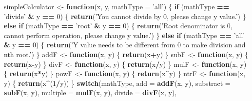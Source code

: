 \documentclass[]{book}
\newenvironment{Shaded}{\begin{snugshade}}{\end{snugshade}}
\newcommand{\KeywordTok}[1]{\textcolor[rgb]{0.13,0.29,0.53}{\textbf{#1}}}
\newcommand{\DataTypeTok}[1]{\textcolor[rgb]{0.13,0.29,0.53}{#1}}
\newcommand{\DecValTok}[1]{\textcolor[rgb]{0.00,0.00,0.81}{#1}}
\newcommand{\StringTok}[1]{\textcolor[rgb]{0.31,0.60,0.02}{#1}}
\newcommand{\ControlFlowTok}[1]{\textcolor[rgb]{0.13,0.29,0.53}{\textbf{#1}}}
\newcommand{\OperatorTok}[1]{\textcolor[rgb]{0.81,0.36,0.00}{\textbf{#1}}}
\newcommand{\NormalTok}[1]{#1}
\theoremstyle{definition}
\theoremstyle{definition}
\theoremstyle{definition}
\theoremstyle{remark}
\begin{document}
\begin{Shaded}
\begin{Highlighting}[]
\NormalTok{simpleCalculator <-}\StringTok{ }\ControlFlowTok{function}\NormalTok{(x, y, }\DataTypeTok{mathType =} \StringTok{'all'}\NormalTok{) \{}
  \ControlFlowTok{if}\NormalTok{ (mathType }\OperatorTok{==}\StringTok{ 'divide'} \OperatorTok{&}\StringTok{ }\NormalTok{y }\OperatorTok{==}\StringTok{ }\DecValTok{0}\NormalTok{) \{}
    \KeywordTok{return}\NormalTok{(}\StringTok{'You cannot divide by 0, please change y value.'}\NormalTok{)}
\NormalTok{  \} }\ControlFlowTok{else} \ControlFlowTok{if}\NormalTok{ (mathType }\OperatorTok{==}\StringTok{ 'root'} \OperatorTok{&}\StringTok{ }\NormalTok{y }\OperatorTok{==}\StringTok{ }\DecValTok{0}\NormalTok{) \{}
    \KeywordTok{return}\NormalTok{(}\StringTok{'Root denominator is 0, cannot perform operation, please change y value.'}\NormalTok{)}
\NormalTok{  \} }\ControlFlowTok{else} \ControlFlowTok{if}\NormalTok{ (mathType }\OperatorTok{==}\StringTok{ 'all'} \OperatorTok{&}\StringTok{ }\NormalTok{y }\OperatorTok{==}\StringTok{ }\DecValTok{0}\NormalTok{) \{}
    \KeywordTok{return}\NormalTok{(}\StringTok{'Y value needs to be different from 0 to make division and nth root.'}\NormalTok{)}
\NormalTok{  \}}
\NormalTok{  addF <-}\StringTok{ }\ControlFlowTok{function}\NormalTok{(x, y) \{}
  \KeywordTok{return}\NormalTok{(x}\OperatorTok{+}\NormalTok{y)}
\NormalTok{  \}}
\NormalTok{  subF <-}\StringTok{ }\ControlFlowTok{function}\NormalTok{(x, y) \{}
  \KeywordTok{return}\NormalTok{(x}\OperatorTok{-}\NormalTok{y)}
\NormalTok{  \}}
\NormalTok{  divF <-}\StringTok{ }\ControlFlowTok{function}\NormalTok{(x, y) \{}
  \KeywordTok{return}\NormalTok{(x}\OperatorTok{/}\NormalTok{y)}
\NormalTok{  \}}
\NormalTok{  mulF <-}\StringTok{ }\ControlFlowTok{function}\NormalTok{(x, y) \{}
  \KeywordTok{return}\NormalTok{(x}\OperatorTok{*}\NormalTok{y)}
\NormalTok{  \}}
\NormalTok{  powF <-}\StringTok{ }\ControlFlowTok{function}\NormalTok{(x, y) \{}
  \KeywordTok{return}\NormalTok{(x}\OperatorTok{^}\NormalTok{y)}
\NormalTok{  \}}
\NormalTok{  ntrF <-}\StringTok{ }\ControlFlowTok{function}\NormalTok{(x, y) \{}
  \KeywordTok{return}\NormalTok{(x}\OperatorTok{^}\NormalTok{(}\DecValTok{1}\OperatorTok{/}\NormalTok{y))}
\NormalTok{  \}}
  \ControlFlowTok{switch}\NormalTok{(mathType,}
         \DataTypeTok{add =} \KeywordTok{addF}\NormalTok{(x, y),}
         \DataTypeTok{substract =} \KeywordTok{subF}\NormalTok{(x, y),}
         \DataTypeTok{multiple =} \KeywordTok{mulF}\NormalTok{(x, y),}
         \DataTypeTok{divide =} \KeywordTok{divF}\NormalTok{(x, y),}

\end{Highlighting}
\end{Shaded}
\end{document}
